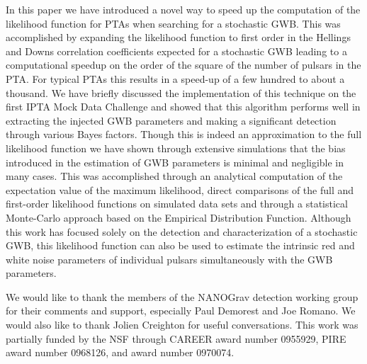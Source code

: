 \documentclass[iop]{emulateapj} \usepackage{apjfonts}
\begin{document}
In this paper we have introduced a novel way to speed up the
computation of the likelihood function for PTAs when searching for a
stochastic GWB. This was accomplished by expanding the likelihood
function to first order in the Hellings and Downs correlation
coefficients expected for a stochastic GWB leading to a computational
speedup on the order of the square of the number of pulsars in the
PTA. For typical PTAs this results in a speed-up of a few hundred to
about a thousand. We have briefly discussed the implementation of this
technique on the first IPTA Mock Data Challenge and showed that this
algorithm performs well in extracting the injected GWB parameters and
making a significant detection through various Bayes factors. Though
this is indeed an approximation to the full likelihood function we
have shown through extensive simulations that the bias introduced in
the estimation of GWB parameters is minimal and negligible in many
cases. This was accomplished through an analytical computation of the
expectation value of the maximum likelihood, direct comparisons of the
full and first-order likelihood functions on simulated data sets and
through a statistical Monte-Carlo approach based on the Empirical
Distribution Function. Although this work has focused solely on the
detection and characterization of a stochastic GWB, this likelihood
function can also be used to estimate the intrinsic red and white
noise parameters of individual pulsars simultaneously with the GWB
parameters.

\acknowledgements We would like to thank the members of the NANOGrav
detection working group for their comments and support, especially
Paul Demorest and Joe Romano. We would also like to thank Jolien
Creighton for useful conversations. This work was partially funded by
the NSF through CAREER award number 0955929, PIRE award number
0968126, and award number 0970074.

\appendix
\end{document}
